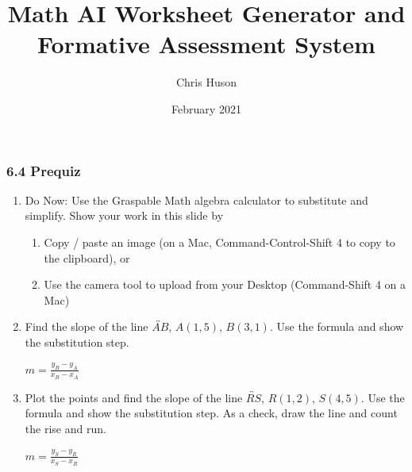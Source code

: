 \documentclass[12pt, twoside]{article}
\title{Math AI Worksheet Generator and Formative Assessment System}
\author{Chris Huson}
\date{February 2021}
\begin{document}
\subsubsection*{6.4 Prequiz}
\begin{enumerate}

\item Do Now: Use the Graspable Math algebra calculator to substitute and simplify. Show your work in this slide by
\begin{enumerate}
  \item Copy / paste an image (on a Mac, Command-Control-Shift 4 to copy to the clipboard), or
  \item Use the camera tool to upload from your Desktop (Command-Shift 4 on a Mac)
\end{enumerate}

\newpage
\item Find the slope of the line $\overleftrightarrow{AB}$, $A(1,5)$, $B(3,1)$. Use the formula and show the substitution step.
\begin{multicols}{2}
  $\displaystyle m = \frac{y_B - y_A}{x_B - x_A}$
    \vspace{2cm}
    \begin{flushright}
    \end{flushright}
\end{multicols}

\newpage
\item Plot the points and find the slope of the line $\overleftrightarrow{RS}$, $R(1,2)$, $S(4,5)$. Use the formula and show the substitution step. As a check, draw the line and count the rise and run.
\begin{multicols}{2}
  $\displaystyle m = \frac{y_S - y_R}{x_S - x_R}$
    \vspace{2cm}
    \begin{flushright}
    \end{flushright}
\end{multicols}


\end{enumerate}
\end{document}
